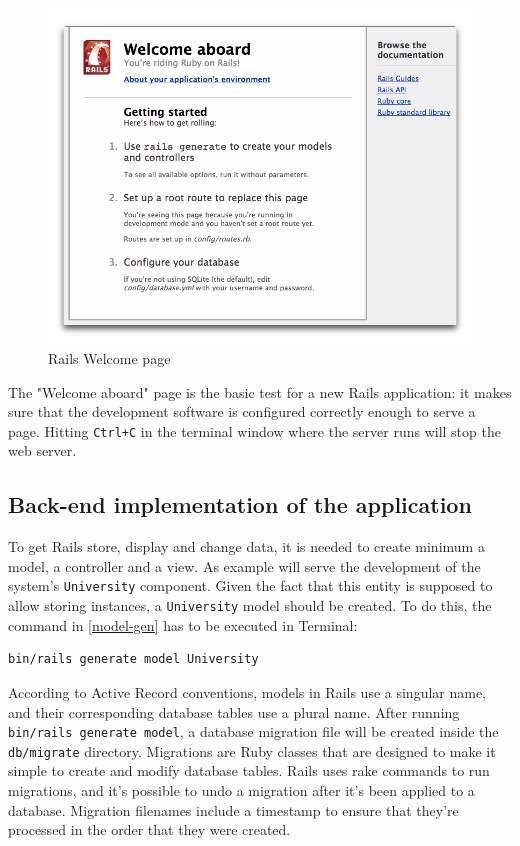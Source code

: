 \begin{figure}[H]
\centering
\includegraphics[width=12cm]{Chapter3/rails_welcome.png}
\caption{Rails Welcome page}
\label{fig:rails-welcome}
\end{figure}

The "Welcome aboard" page is the basic test for a new Rails application: it makes sure that the development software is configured correctly enough to serve a page. Hitting \texttt{Ctrl+C} in the terminal window where the server runs will stop the web server.

\subsection{Back-end implementation of the application}
To get Rails store, display and change data, it is needed to create minimum a model, a controller and a view. As example will serve the development of the system's \texttt{University} component. Given the fact that this entity is supposed to allow storing instances, a \texttt{University} model should be created. To do this, the command in \autoref{model-gen} has to be executed in Terminal:

\begin{lstlisting}[style=nonumbers, caption={Generate model University},label={model-gen}]
bin/rails generate model University
\end{lstlisting}
\bigskip

According to Active Record conventions, models in Rails use a singular name, and their corresponding database tables use a plural name. After running \texttt{bin/rails generate model}, a database migration file will be created inside the \texttt{db/migrate} directory. Migrations are Ruby classes that are designed to make it simple to create and modify database tables. Rails uses rake commands to run migrations, and it's possible to undo a migration after it's been applied to a database. Migration filenames include a timestamp to ensure that they're processed in the order that they were created.

